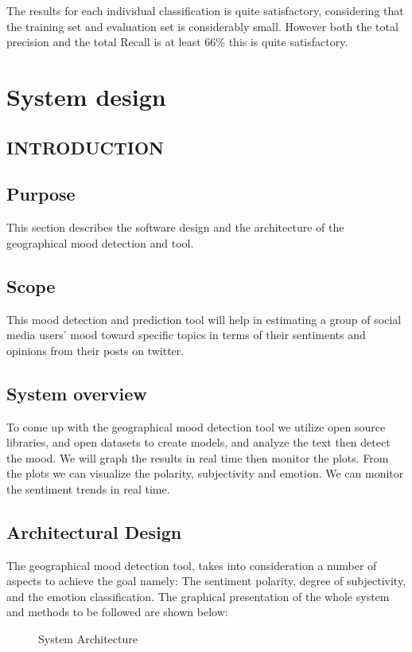 The results for each individual classification is quite satisfactory, considering that the training set and evaluation set is considerably small. However both the total precision and the total Recall is at least 66\% this is quite satisfactory.


\section{System design}
\subsection{INTRODUCTION}
\subsection{Purpose}
This section describes the software design and the architecture of the geographical mood detection and tool.
\subsection{Scope}
This mood detection and prediction tool will help in estimating a group of social media users'
mood toward specific topics in terms of their sentiments and opinions from their posts on twitter.\\

\subsection{System overview}
To come up with the geographical mood detection tool we utilize open source libraries, and open datasets to create models, and analyze the text then detect the mood. We will graph the results in real time then monitor the plots. From the plots we can visualize the polarity, subjectivity and emotion. We can monitor the sentiment trends in real time.

\subsection{Architectural Design}
The geographical mood detection tool, takes into consideration a number of aspects to achieve the goal namely: The sentiment polarity, degree of subjectivity, and the emotion classification. The graphical presentation of the whole system and methods to be followed are shown below:

\begin{figure}[h]
  \centering
  \caption[Example figure]%
  {System Architecture}
  \label{fig:ALAP:sm1}
\end{figure}


